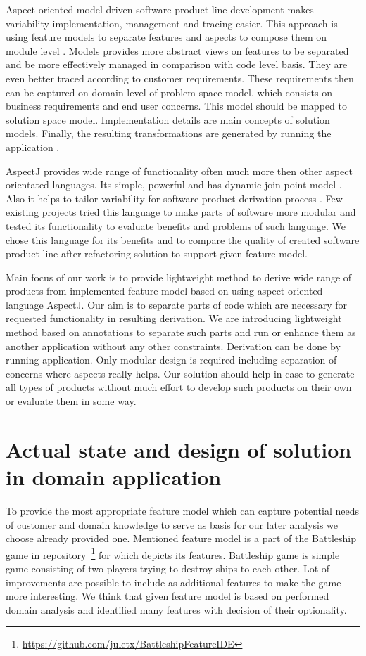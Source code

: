 \documentclass[11pt,english,a4paper,twoside]{article}
\begin{document}
Aspect-oriented model-driven software product line development makes variability implementation, management and tracing easier. This approach is using feature models to separate features and aspects to compose them on module level \cite{voelter_product_2007}. Models provides more abstract views on features to be separated and be more effectively managed in comparison with code level basis. They are even better traced according to customer requirements. These requirements then can be captured on domain level of problem space model, which consists on business requirements and end user concerns. This model should be mapped to solution space model. Implementation details are main concepts of solution models. Finally, the resulting transformations are generated by running the application \cite{voelter_product_2007}. 

AspectJ provides wide range of functionality often much more then other aspect orientated languages. Its simple, powerful and has dynamic join point model \cite{goos_overview_2001}. Also it helps to tailor variability for software product derivation process \cite{young_using_1999}. Few existing projects tried this language to make parts of software more modular and tested its functionality to evaluate benefits and problems of such language. We chose this language for its benefits and to compare the quality of created software product line after refactoring solution to support given feature model.


Main focus of our work is to provide lightweight method to derive wide range of products from implemented feature model based on using aspect oriented language AspectJ. Our aim is to separate parts of code which are necessary for requested functionality in resulting derivation. We are introducing lightweight method based on annotations to separate such parts and run or enhance them as another application without any other constraints. Derivation can be done by running application. Only modular design is required including separation of concerns where aspects really helps. Our solution should help in case to generate all types of products without much effort to develop such products on their own or evaluate them in some way. 
      
			
\section{Actual state and design of solution in domain application} \label{actualGameState}

To provide the most appropriate feature model which can capture potential needs of customer and domain knowledge to serve as basis for our later analysis we choose already provided one. Mentioned feature model is a part of the Battleship game in repository~\footnote{\url{https://github.com/juletx/BattleshipFeatureIDE}} for which depicts its features. Battleship game is simple game consisting of two players trying to destroy ships to each other. Lot of improvements are possible to include as additional features to make the game more interesting. We think that given feature model is based on performed domain analysis and identified many features with decision of their optionality.
\end{document}
